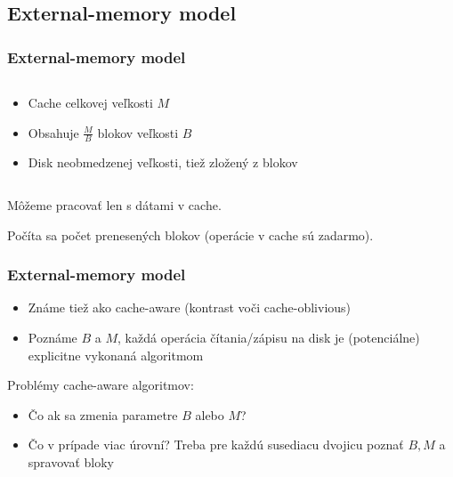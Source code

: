 \documentclass{beamer}
\begin{document}
\subsection{External-memory model}
\begin{frame}
    \frametitle{External-memory model}%
	\begin{columns}[T]
		\begin{column}{.4\textwidth}
			\begin{itemize}
				\item Cache celkovej veľkosti $M$
				\item Obsahuje $\frac{M}{B}$ blokov veľkosti $B$
				\item Disk neobmedzenej veľkosti, tiež zložený z blokov
			\end{itemize}
		\end{column}
		\begin{column}{.6\textwidth}\raggedleft
		    \resizebox{\textwidth}{!}{%
                    
            }    
		\end{column}
	\end{columns}
	\bigskip
	Môžeme pracovať len s dátami v cache.
	
    Počíta sa počet prenesených blokov (operácie v cache sú zadarmo).
    
	
\end{frame}

\begin{frame}
	\frametitle{External-memory model}
	\begin{itemize}
		\item Známe tiež ako cache-aware (kontrast voči cache-oblivious)
		\item Poznáme $B$ a $M$, každá operácia čítania/zápisu na disk je (potenciálne) explicitne vykonaná algoritmom
	\end{itemize}
    Problémy cache-aware algoritmov:
    \begin{itemize}
            \item Čo ak sa zmenia parametre $B$ alebo $M$?
		    \item Čo v prípade viac úrovní? Treba pre každú susediacu dvojicu poznať $B, M$  a spravovať bloky
    \end{itemize}
\end{frame}
\end{document}
